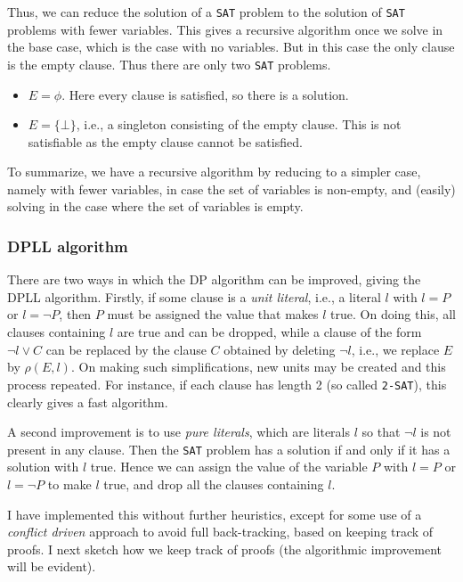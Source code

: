 Thus, we can reduce the solution of a \texttt{SAT} problem to the
solution of \texttt{SAT} problems with fewer variables. This gives a
recursive algorithm once we solve in the base case, which is the case
with no variables. But in this case the only clause is the empty clause.
Thus there are only two \texttt{SAT} problems.

\begin{itemize}
\tightlist
\item
  \(E = \phi\). Here every clause is satisfied, so there is a solution.
\item
  \(E = \{\bot\}\), i.e., a singleton consisting of the empty clause.
  This is not satisfiable as the empty clause cannot be satisfied.
\end{itemize}

To summarize, we have a recursive algorithm by reducing to a simpler
case, namely with fewer variables, in case the set of variables is
non-empty, and (easily) solving in the case where the set of variables
is empty.

\hypertarget{dpll-algorithm}{%
\subsubsection{DPLL algorithm}\label{dpll-algorithm}}

There are two ways in which the DP algorithm can be improved, giving the
DPLL algorithm. Firstly, if some clause is a \emph{unit literal}, i.e.,
a literal \(l\) with \(l = P\) or \(l = \neg P\), then \(P\) must be
assigned the value that makes \(l\) true. On doing this, all clauses
containing \(l\) are true and can be dropped, while a clause of the form
\(\neg l\vee C\) can be replaced by the clause \(C\) obtained by
deleting \(\neg l\), i.e., we replace \(E\) by \(\rho(E, l)\). On making
such simplifications, new units may be created and this process
repeated. For instance, if each clause has length 2 (so called
\texttt{2-SAT}), this clearly gives a fast algorithm.

A second improvement is to use \emph{pure literals}, which are literals
\(l\) so that \(\neg l\) is not present in any clause. Then the
\texttt{SAT} problem has a solution if and only if it has a solution
with \(l\) true. Hence we can assign the value of the variable \(P\)
with \(l = P\) or \(l = \neg P\) to make \(l\) true, and drop all the
clauses containing \(l\).

I have implemented this without further heuristics, except for some use
of a \emph{conflict driven} approach to avoid full back-tracking, based
on keeping track of proofs. I next sketch how we keep track of proofs
(the algorithmic improvement will be evident).

